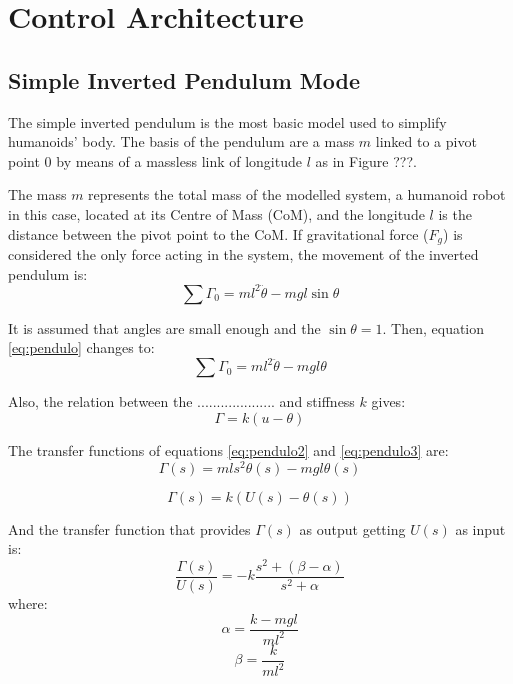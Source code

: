 \chapter{Control Architecture}
\section{Simple Inverted Pendulum Mode}
The simple inverted pendulum is the most basic model used to simplify humanoids' body. The basis of the pendulum are a mass $m$ linked to a pivot point $0$ by means of a massless link of longitude $l$ as in Figure ???.

The mass $m$ represents the total mass of the modelled system, a humanoid robot in this case, located at its Centre of Mass (CoM), and the longitude $l$ is the distance between the pivot point to the CoM. If gravitational force ($F_g$) is considered the only force acting in the system, the movement of the inverted pendulum is:
\begin{equation}
\sum{\Gamma_0} = ml^2 \ddot{\theta} - mgl\sin\theta
\label{eq:pendulo}
\end{equation}

It is assumed that angles are small enough and the $\sin\theta = 1$. Then, equation \ref{eq:pendulo} changes to:
\begin{equation}
\sum{\Gamma_0} = ml^2 \ddot{\theta} - mgl\theta
\label{eq:pendulo2}
\end{equation}

Also, the relation between the .................... and stiffness $k$ gives:
\begin{equation}
\Gamma = k(u-\theta)
\label{eq:pendulo3}
\end{equation}

The transfer functions of equations \ref{eq:pendulo2} and \ref{eq:pendulo3} are:
\begin{equation}
\Gamma(s) = mls^2\theta(s) - mgl\theta(s)
\end{equation}

\begin{equation}
\Gamma(s) = k(U(s)-\theta(s))
\end{equation}

And the transfer function that provides $\Gamma(s)$ as output getting $U(s)$ as input is:
\begin{equation}
\frac{\Gamma(s)}{U(s)} = -k \frac{s^2+(\beta - \alpha)}{s^2 + \alpha}
\label{eq:TFpar}
\end{equation}
where:
\begin{equation}
\alpha = \frac{k-mgl}{ml^2}
\end{equation}
\begin{equation}
\beta = \frac{k}{ml^2}
\end{equation}

